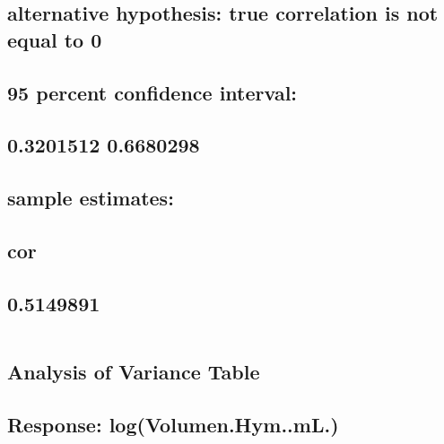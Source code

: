 \documentclass[
]{article}
\begin{document}
\hypertarget{alternative-hypothesis-true-correlation-is-not-equal-to-0}{%
\subsection{alternative hypothesis: true correlation is not equal to
0}\label{alternative-hypothesis-true-correlation-is-not-equal-to-0}}

\hypertarget{percent-confidence-interval}{%
\subsection{95 percent confidence
interval:}\label{percent-confidence-interval}}

\hypertarget{section-15}{%
\subsection{0.3201512 0.6680298}\label{section-15}}

\hypertarget{sample-estimates}{%
\subsection{sample estimates:}\label{sample-estimates}}

\hypertarget{cor}{%
\subsection{cor}\label{cor}}

\hypertarget{section-16}{%
\subsection{0.5149891}\label{section-16}}

\begin{verbatim}
\end{verbatim}

\hypertarget{analysis-of-variance-table}{%
\subsection{Analysis of Variance
Table}\label{analysis-of-variance-table}}

\hypertarget{section-17}{%
\subsection{}\label{section-17}}

\hypertarget{response-logvolumen.hym..ml.}{%
\subsection{Response:
log(Volumen.Hym..mL.)}\label{response-logvolumen.hym..ml.}}
\end{document}

